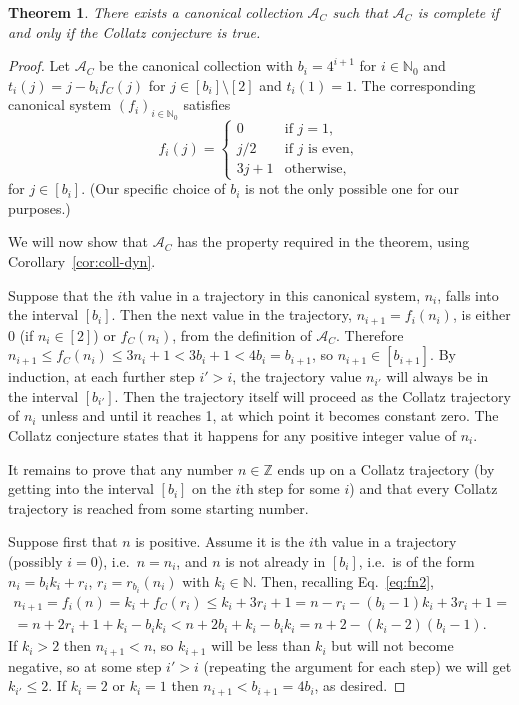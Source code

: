 \documentclass[12pt]{article}
\newtheorem{theorem}{Theorem}
\theoremstyle{definition}
\newcommand{\N}{\mathbb{N}}
\newcommand{\Z}{\mathbb{Z}}
\begin{document}
\begin{theorem}
\label{th:Collatz}
There exists a canonical collection $\mathcal{A}_C$ such that $\mathcal{A}_C$ is complete if and only if the Collatz conjecture is true.
\end{theorem}
\begin{proof}
Let $\mathcal{A}_C$ be the canonical collection with $b_i=4^{i+1}$ for $i\in\N_0$ and $t_i(j) = j-b_if_C(j)$ for $j\in[b_i]\setminus[2]$ and $t_i(1) = 1$. The corresponding canonical system $(f_i)_{i\in\N_0}$ satisfies
\[
f_i(j) = 
\begin{cases}
0 & \text{if } j = 1, \\
j/2 & \text{if $j$ is even}, \\
3j+1 & \text{otherwise,}
\end{cases}
\]
for $j\in[b_i]$.
(Our specific choice of $b_i$ is not the only possible one for our purposes.)

We will now show that $\mathcal{A}_C$ has the property required in the theorem, using Corollary~\ref{cor:coll-dyn}.

Suppose that the $i$th value in a trajectory in this canonical system, $n_i$, falls into the interval $[b_i]$. Then the next value in the trajectory, $n_{i+1} = f_{i}(n_i)$, is either 0 (if $n_i\in[2]$) or $f_C(n_i)$, from the definition of $\mathcal{A}_C$. Therefore $n_{i+1} \leqslant f_C(n_i) \leqslant 3n_i+1 < 3b_i+1 < 4b_i = b_{i+1}$, so $n_{i+1}\in[b_{i+1}]$. By induction, at each further step $i'>i$, the trajectory value $n_{i'}$ will always be in the interval $[b_{i'}]$. Then the trajectory itself will proceed as the Collatz trajectory of $n_i$ unless and until it reaches 1, at which point it becomes constant zero. The Collatz conjecture states that it happens for any positive integer value of $n_i$.

It remains to prove that any number $n\in\Z$ ends up on a Collatz trajectory (by getting into the interval $[b_i]$ on the $i$th step for some $i$) and that every Collatz trajectory is reached from some starting number.

Suppose first that $n$ is positive. Assume it is the $i$th value in a trajectory (possibly $i=0$), i.e.\ $n=n_i$, and $n$ is not already in $[b_i]$, i.e.\ is of the form $n_i=b_i k_i + r_i$, $r_i= r_{b_i}(n_i)$ with $k_i\in\N$. Then, recalling Eq.~\eqref{eq:fn2},
\begin{multline*}
n_{i+1} = f_i(n) = k_i + f_C(r_i) \leqslant k_i + 3r_i+1 = n-r_i - (b_i-1)k_i + 3r_i+1 = \\ = n + 2r_i + 1 + k_i - b_i k_i < n  + 2b_i + k_i - b_i k_i = n + 2 - (k_i-2)(b_i-1).
\end{multline*}
If $k_i>2$ then $n_{i+1}<n$, so $k_{i+1}$ will be less than $k_i$ but will not become negative, so at some step $i'>i$ (repeating the argument for each step) we will get $k_{i'}\leqslant2$. If $k_i=2$ or $k_i=1$ then $n_{i+1}<b_{i+1}=4b_i$, as desired.


\end{proof}
\end{document}

